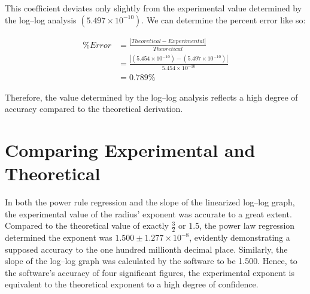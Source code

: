 \documentclass[12pt]{article}
\begin{document}
This coefficient deviates only slightly from the experimental value determined by the log–log analysis $(5.497 \times 10^{-10})$. We can determine the percent error like so:

\begin{align*}
\% Error &= \frac{ | Theoretical-Experimental | }{Theoretical} \\
&= \frac{ | (5.454 \times 10^{-10}) - ( 5.497 \times 10^{-10} ) | }{5.454 \times 10^{-10}} \\
&= 0.789 \%
\end{align*}

Therefore, the value determined by the log–log analysis reflects a high degree of accuracy compared to the theoretical derivation. 

\section{Comparing Experimental and Theoretical}

In both the power rule regression and the slope of the linearized log–log graph,  the experimental value of the radius' exponent was accurate to a great extent.  Compared to the theoretical value of exactly $\frac{3}{2}$ or $1.5$, the power law regression determined the exponent was $1.500 \pm 1.277 \times 10^{-8}$, evidently demonstrating a supposed accuracy to the one hundred millionth decimal place.  Similarly, the slope of the log–log graph was calculated by the software to be 1.500. Hence, to the software's accuracy of four significant figures, the experimental exponent is equivalent to the theoretical exponent to a high degree of confidence.
\end{document}
